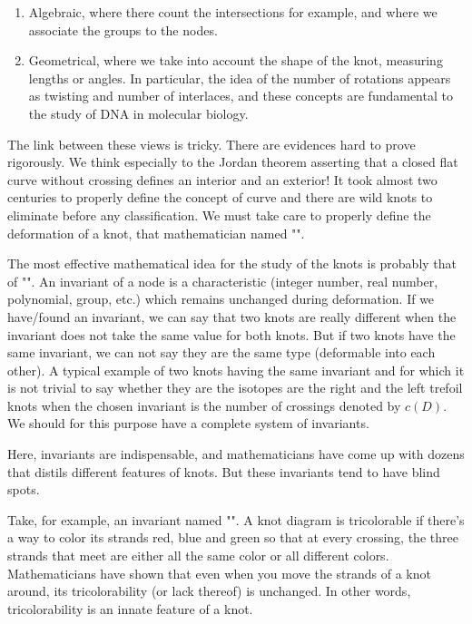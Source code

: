 {\begin{enumerate}
		\item Algebraic, where there count the intersections for example, and where we associate the groups to the nodes.
		
		\item Geometrical, where we take into account the shape of the knot, measuring lengths or angles. In particular, the idea of the number of rotations appears as twisting and number of interlaces, and these concepts are fundamental to the study of DNA in molecular biology.
	\end{enumerate}
	
	The link between these views is tricky. There are evidences hard to prove rigorously. We think especially to the Jordan theorem asserting that a closed flat curve without crossing defines an interior and an exterior! It took almost two centuries to properly define the concept of curve and there are wild knots to eliminate before any classification. We must take care to properly define the deformation of a knot, that mathematician named "".
	
	The most effective mathematical idea for the study of the knots is probably that of "". An invariant of a node is a characteristic (integer number, real number, polynomial, group, etc.) which remains unchanged during deformation. If we have/found an invariant, we can say that two knots are really different when the invariant does not take the same value for both knots. But if two knots have the same invariant, we can not say they are the same type (deformable into each other). A typical example of two knots having the same invariant and for which it is not trivial to say whether they are the isotopes are the right and the left trefoil knots when the chosen invariant is the number of crossings denoted by $c(D)$. We should for this purpose have a complete system of invariants.
	
	Here, invariants are indispensable, and mathematicians have come up with dozens that distils different features of knots. But these invariants tend to have blind spots.
	
	Take, for example, an invariant named "". A knot diagram is tricolorable if there's a way to color its strands red, blue and green so that at every crossing, the three strands that meet are either all the same color or all different colors. Mathematicians have shown that even when you move the strands of a knot around, its tricolorability (or lack thereof) is unchanged. In other words, tricolorability is an innate feature of a knot.

}
